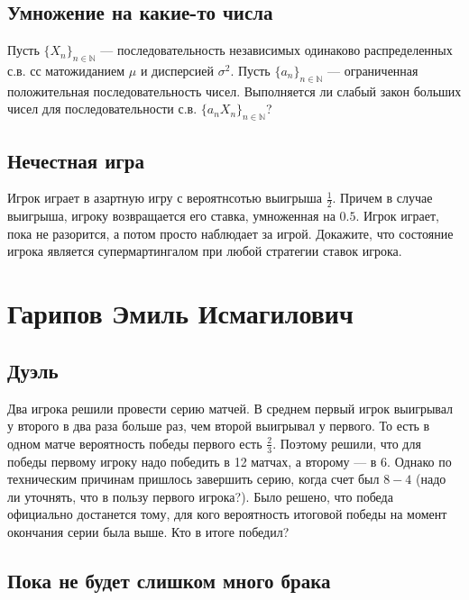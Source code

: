 \documentclass[12pt]{article}
\newcommand\N{\mathbb{N}}
\begin{document}
\subsection{Умножение на какие-то числа}

Пусть $\{X_n\}_{n \in \N}$ --- последовательность независимых одинаково распределенных с.в. сс матожиданием $\mu$ и дисперсией $\sigma^2$. Пусть $\{a_n\}_{n \in \N}$ --- ограниченная положительная последовательность чисел. Выполняется ли слабый закон больших чисел для последовательности с.в. $\{a_n X_n\}_{n \in \N}$?



\subsection{Нечестная игра}

Игрок играет в азартную игру с вероятнсотью выигрыша $\frac{1}{2}$. Причем в случае выигрыша, игроку возвращается его ставка, умноженная на $0.5$. Игрок играет, пока не разорится, а потом просто наблюдает за игрой. Докажите, что состояние игрока является супермартингалом при любой стратегии ставок игрока.



\newpage
\section{Гарипов Эмиль Исмагилович}

\subsection{Дуэль}

Два игрока решили провести серию матчей. В среднем первый игрок выигрывал у второго в два раза больше раз, чем второй выигрывал у первого. То есть в одном матче вероятность победы первого есть $\frac{2}{3}$. Поэтому решили, что для победы первому игроку надо победить в 12 матчах, а второму --- в 6. Однако по техническим причинам пришлось завершить серию, когда счет был $8-4$ (надо ли уточнять, что в пользу первого игрока?). Было решено, что победа официально достанется тому, для кого вероятность итоговой победы на момент окончания серии была выше. Кто в итоге победил?



\subsection{Пока не будет слишком много брака}
\end{document}
